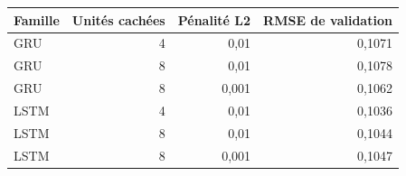 \begin{tabular}{lrrr}\toprule
Famille & Unités cachées & Pénalité L2 & RMSE de validation \\\midrule
GRU & 4 & 0,01 & 0,1071 \\
GRU & 8 & 0,01 & 0,1078 \\
GRU & 8 & 0,001 & 0,1062 \\
LSTM & 4 & 0,01 & 0,1036 \\
LSTM & 8 & 0,01 & 0,1044 \\
LSTM & 8 & 0,001 & 0,1047 \\
\bottomrule\end{tabular}

